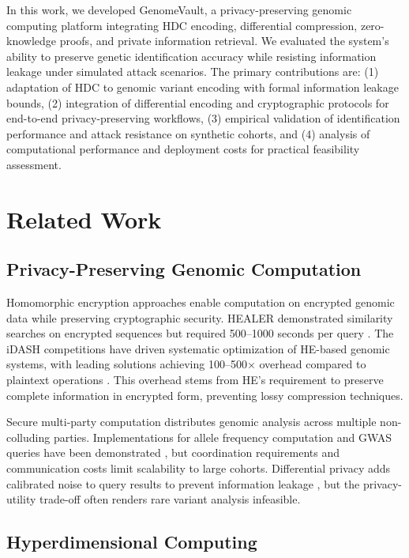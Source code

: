 \documentclass[11pt,letterpaper]{article}
\begin{document}
In this work, we developed GenomeVault, a privacy-preserving genomic computing platform integrating HDC encoding, differential compression, zero-knowledge proofs, and private information retrieval. We evaluated the system's ability to preserve genetic identification accuracy while resisting information leakage under simulated attack scenarios. The primary contributions are: (1) adaptation of HDC to genomic variant encoding with formal information leakage bounds, (2) integration of differential encoding and cryptographic protocols for end-to-end privacy-preserving workflows, (3) empirical validation of identification performance and attack resistance on synthetic cohorts, and (4) analysis of computational performance and deployment costs for practical feasibility assessment.

\section{Related Work}

\subsection{Privacy-Preserving Genomic Computation}

Homomorphic encryption approaches enable computation on encrypted genomic data while preserving cryptographic security. HEALER demonstrated similarity searches on encrypted sequences but required 500--1000 seconds per query \cite{chen2016}. The iDASH competitions have driven systematic optimization of HE-based genomic systems, with leading solutions achieving 100--500$\times$ overhead compared to plaintext operations \cite{wang2017}. This overhead stems from HE's requirement to preserve complete information in encrypted form, preventing lossy compression techniques.

Secure multi-party computation distributes genomic analysis across multiple non-colluding parties. Implementations for allele frequency computation and GWAS queries have been demonstrated \cite{kamm2013}, but coordination requirements and communication costs limit scalability to large cohorts. Differential privacy adds calibrated noise to query results to prevent information leakage \cite{simmons2016}, but the privacy-utility trade-off often renders rare variant analysis infeasible.

\subsection{Hyperdimensional Computing}
\end{document}
